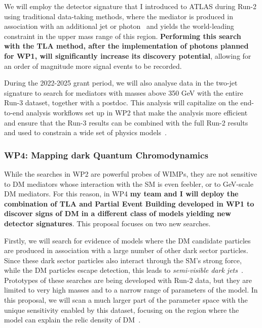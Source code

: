 \documentclass[11pt,a4paper]{article}
\begin{document}
We will employ the detector signature that I introduced to ATLAS during Run-2 using traditional data-taking methods, where the mediator is produced in association with an additional jet or photon~\cite{Aaboud:2019zxd} and yields the world-leading constraint in the upper mass range of this region. 
\textbf{Performing this search with the TLA method, after the implementation of photons planned for WP1, will significantly increase its discovery potential}, 
allowing for an order of magnitude more signal events to be recorded.%

During the 2022-2025 grant period, we will also analyse data in the two-jet signature to search for mediators with masses above 350 GeV with the entire Run-3 dataset, together with a postdoc. 
This analysis will capitalize on the end-to-end analysis workflows set up in WP2 that make the analysis more efficient and ensure that the Run-3 results can be combined with the full Run-2 results and used to constrain a wide set of physics models~\cite{Kim:2019rhy}.   

\subsubsection*{WP4: Mapping dark Quantum Chromodynamics}

While the searches in WP2 are powerful probes of WIMPs, they are not sensitive to DM mediators whose interaction with the SM is even feebler, or to GeV-scale DM mediators. 
For this reason, in WP4 \textbf
{my team and I will deploy the combination of TLA and Partial Event Building developed in WP1 to discover signs of DM in a different class of models yielding new detector signatures}. 
This proposal focuses on two new searches.  

Firstly, we will search for evidence of models where the DM candidate particles are produced in association with a large number of other dark sector particles. 
Since these dark sector particles also interact through the SM's strong force, while the DM particles escape detection, this leads to \textit{semi-visible dark jets}~\cite{Cohen:2017pzm}.
Prototypes of these searches are being developed with Run-2 data, but they are limited to very high masses and to a narrow range of parameters of the model. 
In this proposal, we will scan a much larger part of the parameter space with the unique sensitivity enabled by this dataset, focusing on the region where the model can explain the relic density of DM~\cite{Bernreuther:2019pfb}. 
\end{document}
